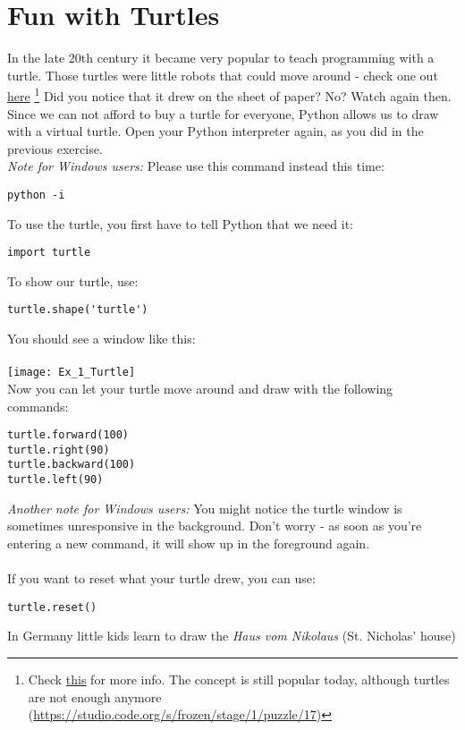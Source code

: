 \documentclass{article}
\begin{document}
\section{Fun with Turtles}
In the late 20th century it became very popular to teach programming with a
turtle. Those turtles were little robots that could move around - check one
out \href{https://youtu.be/8wU6NdjTVTA}{here}
\footnote{Check \href{https://en.wikipedia.org/wiki/Turtle_(robot)}{this} for more info.
The concept is still popular today, although turtles are not enough anymore
(\href{https://studio.code.org/s/frozen/stage/1/puzzle/17}{https://studio.code.org/s/frozen/stage/1/puzzle/17})
}
Did you notice that it drew on the sheet of paper? No? Watch again then.\\
Since we can not afford to buy a turtle for everyone, Python allows us to draw
with a virtual turtle. Open your Python interpreter again, as you did in the
previous exercise.\\
\textit{Note for Windows users:} Please use this command instead this time:
\begin{lstlisting}
python -i
\end{lstlisting}
To use the turtle, you first have to tell Python that we need it:
\begin{lstlisting}
import turtle
\end{lstlisting}
To show our turtle, use:
\begin{lstlisting}
turtle.shape('turtle')
\end{lstlisting}
You should see a window like this:\\\\
\texttt{[image: Ex\_1\_Turtle]}\\
Now you can let your turtle move around and draw with the following commands:
\begin{lstlisting}
turtle.forward(100)
turtle.right(90)
turtle.backward(100)
turtle.left(90)
\end{lstlisting}
\textit{Another note for Windows users:} You might notice the turtle window is
sometimes unresponsive in the background. Don't worry - as soon as you're entering
a new command, it will show up in the foreground again.\\\\
If you want to reset what your turtle drew, you can use:
\begin{lstlisting}
turtle.reset()
\end{lstlisting}
In Germany little kids learn to draw the \textit{Haus vom Nikolaus} (St. Nicholas' house)
\end{document}
